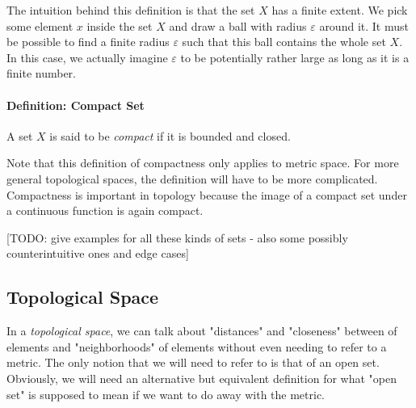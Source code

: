 \medskip
The intuition behind this definition is that the set $X$ has a finite extent. We pick some element $x$ inside the set $X$ and draw a ball with radius $\varepsilon$ around it. It must be possible to find a finite radius $\varepsilon$ such that this ball contains the whole set $X$. In this case, we actually imagine $\varepsilon$ to be potentially rather large as long as it is a finite number.

\paragraph{Definition: Compact Set} A set $X$ is said to be \emph{compact} if it is bounded and closed.

\medskip
Note that this definition of compactness only applies to metric space. For more general topological spaces, the definition will have to be more complicated. Compactness is important in topology because the image of a compact set under a continuous function is again compact. 


[TODO: give examples for all these kinds of sets - also some possibly counterintuitive ones and edge cases]













\subsection{Topological Space}
In a \emph{topological space}, we can talk about "distances" and "closeness" between of elements and "neighborhoods" of elements without even needing to refer to a metric. The only notion that we will need to refer to is that of an open set. Obviously, we will need an alternative but equivalent definition for what "open set" is supposed to mean if we want to do away with the metric.

